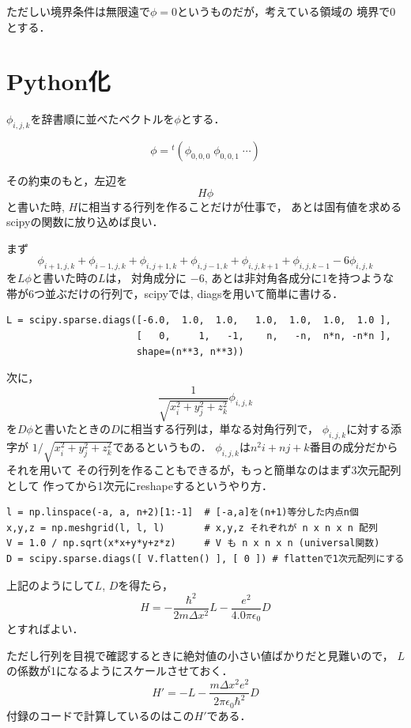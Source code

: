 \documentclass[dvipdfmx]{article}
\begin{document}
ただしい境界条件は無限遠で$\phi = 0$というものだが，考えている領域の
境界で0とする．

\section{Python化}
$\phi_{i,j,k}$を辞書順に並べたベクトルを$\phi$とする．

\[ \phi = {}^t(\phi_{0,0,0}\; \phi_{0,0,1}\; \cdots) \]

その約束のもと，左辺を
\[ H \phi \]
と書いた時, $H$に相当する行列を作ることだけが仕事で，
あとは固有値を求めるscipyの関数に放り込めば良い．

まず
\[
  \phi_{i+1,j,k} + \phi_{i-1,j,k} 
+ \phi_{i,j+1,k} + \phi_{i,j-1,k} 
+ \phi_{i,j,k+1} + \phi_{i,j,k-1} 
- 6 \phi_{i,j,k}
\]
を$L \phi$と書いた時の$L$は，
対角成分に $-6$, あとは非対角各成分に1を持つような
帯が6つ並ぶだけの行列で，scipyでは, 
diagsを用いて簡単に書ける．

\begin{lstlisting}
L = scipy.sparse.diags([-6.0,  1.0,  1.0,   1.0,  1.0,  1.0,  1.0 ], 
                       [   0,     1,   -1,    n,   -n,  n*n, -n*n ], 
                       shape=(n**3, n**3))
\end{lstlisting}

次に，
\[ 
\frac{1}{\sqrt{x_i^2 + y_j^2 + z_k^2}} \phi_{i,j,k}
\]
を$D \phi$と書いたときの$D$に相当する行列は，単なる対角行列で，
$\phi_{i,j,k}$に対する添字が
$1/\sqrt{x_i^2 + y_j^2 + z_k^2}$であるというもの．
$\phi_{i,j,k}$は$n^2 i + n j + k$番目の成分だからそれを用いて
その行列を作ることもできるが，もっと簡単なのはまず3次元配列として
作ってから1次元にreshapeするというやり方．

\begin{lstlisting}
l = np.linspace(-a, a, n+2)[1:-1]  # [-a,a]を(n+1)等分した内点n個
x,y,z = np.meshgrid(l, l, l)       # x,y,z それぞれが n x n x n 配列
V = 1.0 / np.sqrt(x*x+y*y+z*z)     # V も n x n x n (universal関数)
D = scipy.sparse.diags([ V.flatten() ], [ 0 ]) # flattenで1次元配列にする
\end{lstlisting}

上記のようにして$L$, $D$を得たら，
\[ H = -\frac{\hbar^2}{2 m \Delta x^2} L 
       - \frac{e^2}{4.0 \pi \epsilon_0} D 
\]
とすればよい．

ただし行列を目視で確認するときに絶対値の小さい値ばかりだと見難いので，
$L$の係数が1になるようにスケールさせておく．
\[ H' = -L 
       - \frac{m \Delta x^2 e^2}{2 \pi \epsilon_0 \hbar^2} D \]
付録のコードで計算しているのはこの$H'$である．
\end{document}
